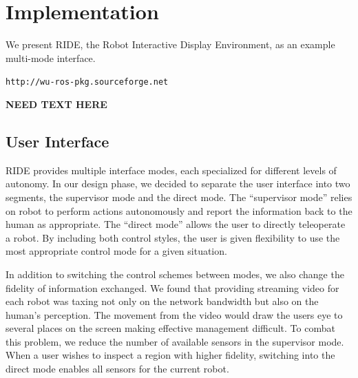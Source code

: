 \chapter{Implementation}

We present RIDE, the Robot Interactive Display Environment, as an example multi-mode interface.

\verb!http://wu-ros-pkg.sourceforge.net!

\textbf{NEED TEXT HERE}






\section{User Interface}
\label{sec:ride_user_interface}

RIDE provides multiple interface modes, each specialized for different levels of autonomy. In our design phase, we decided to separate the user interface into two segments, the supervisor mode and the direct mode. The ``supervisor mode'' relies on robot to perform actions autonomously and report the information back to the human as appropriate. The ``direct mode'' allows the user to directly teleoperate a robot. By including both control styles, the user is given flexibility to use the most appropriate control mode for a given situation.

In addition to switching the control schemes between modes, we also change the fidelity of information exchanged. We found that providing streaming video for each robot was taxing not only on the network bandwidth but also on the human's perception. The movement from the video would draw the users eye to several places on the screen making effective management difficult. To combat this problem, we reduce the number of available sensors in the supervisor mode. When a user wishes to inspect a region with higher fidelity, switching into the direct mode enables all sensors for the current robot.

